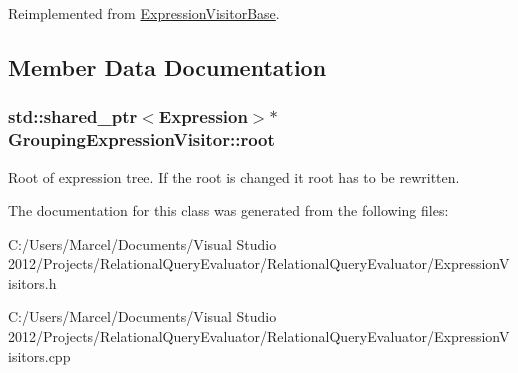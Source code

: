 Reimplemented from \hyperlink{class_expression_visitor_base_aebbbbe9a1cecabe4c4804bf1ef82a9f9}{Expression\+Visitor\+Base}.



\subsection{Member Data Documentation}
\hypertarget{class_grouping_expression_visitor_a493ef343ca18357dca158d83085b5ab4}{
\subsubsection[{root}]{\setlength{\rightskip}{0pt plus 5cm}std\+::shared\+\_\+ptr$<${\bf Expression}$>$$\ast$ Grouping\+Expression\+Visitor\+::root}}\label{class_grouping_expression_visitor_a493ef343ca18357dca158d83085b5ab4}
Root of expression tree. If the root is changed it root has to be rewritten. 

The documentation for this class was generated from the following files\+:\begin{DoxyCompactItemize}
\item 
C\+:/\+Users/\+Marcel/\+Documents/\+Visual Studio 2012/\+Projects/\+Relational\+Query\+Evaluator/\+Relational\+Query\+Evaluator/Expression\+Visitors.\+h\item 
C\+:/\+Users/\+Marcel/\+Documents/\+Visual Studio 2012/\+Projects/\+Relational\+Query\+Evaluator/\+Relational\+Query\+Evaluator/Expression\+Visitors.\+cpp\end{DoxyCompactItemize}
